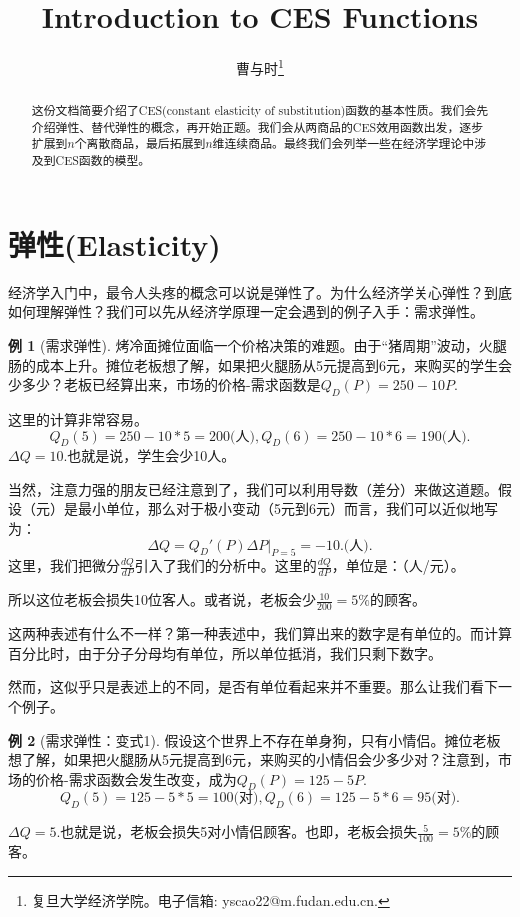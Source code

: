\documentclass[UTF8]{ctexart}
\theoremstyle{definition}
\newtheorem{example}{\kaishu 例}[section]
\begin{document}
\title{Introduction to CES Functions}
\author{曹与时\footnote{
  复旦大学经济学院。电子信箱: yscao22@m.fudan.edu.cn.
}}
\date{}
\maketitle

\begin{abstract}
这份文档简要介绍了CES(constant elasticity of substitution)函数的基本性质。我们会先介绍弹性、替代弹性的概念，再开始正题。我们会从两商品的CES效用函数出发，逐步扩展到$n$个离散商品，最后拓展到$n$维连续商品。最终我们会列举一些在经济学理论中涉及到CES函数的模型。
\end{abstract}

\tableofcontents

\newpage
\section{弹性(Elasticity)}
经济学入门中，最令人头疼的概念可以说是弹性了。为什么经济学关心弹性？到底如何理解弹性？我们可以先从经济学原理一定会遇到的例子入手：需求弹性。

\begin{example}[\kaishu 需求弹性]
\kaishu 烤冷面摊位面临一个价格决策的难题。由于“猪周期”波动，火腿肠的成本上升。摊位老板想了解，如果把火腿肠从5元提高到6元，来购买的学生会少多少？老板已经算出来，市场的价格-需求函数是$Q_D(P)=250-10P.$
\end{example}
这里的计算非常容易。
\[
Q_D(5)=250-10*5=200\text{(人)}, Q_D(6)=250-10*6=190\text{(人)}. 
\]
$\Delta Q=10.$也就是说，学生会少10人。

当然，注意力强的朋友已经注意到了，我们可以利用{\kaishu 导数（差分）}来做这道题。假设（元）是最小单位，那么对于极小变动（5元到6元）而言，我们可以近似地写为：
\[\Delta Q=Q_D'(P) \Delta P |_{P=5}=-10.\text{(人)}.\]
这里，我们把微分$\frac{dQ}{dP}$引入了我们的分析中。这里的$\frac{dQ}{dP}$，单位是：（人/元）。

所以这位老板会损失10位客人。或者说，老板会少$\frac{10}{200}=5\%$的顾客。

这两种表述有什么不一样？第一种表述中，我们算出来的数字是有单位的。而计算百分比时，由于分子分母均有单位，所以单位抵消，我们只剩下数字。

然而，这似乎只是表述上的不同，是否有单位看起来并不重要。那么让我们看下一个例子。
\begin{example}[\kaishu 需求弹性：变式1]
\kaishu 假设这个世界上不存在单身狗，只有小情侣。摊位老板想了解，如果把火腿肠从5元提高到6元，来购买的小情侣会少多少对？注意到，市场的价格-需求函数会发生改变，成为$Q_D(P)=125-5P.$
\[
Q_D(5)=125-5*5=100\text{(对)}, Q_D(6)=125-5*6=95\text{(对)}. 
\]
\end{example}
$\Delta Q=5.$也就是说，老板会损失5对小情侣顾客。也即，老板会损失$\frac{5}{100}=5\%$的顾客。
\end{document}
